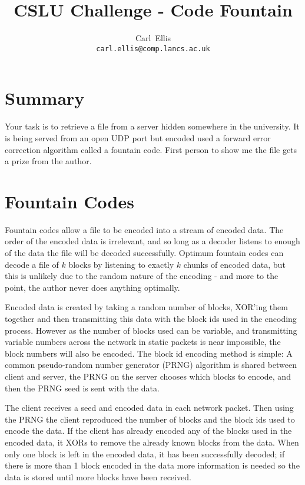 \documentclass[10pt,a4paper]{article}
\begin{document}
\title{CSLU Challenge - Code Fountain}

\author{Carl~Ellis \\ \texttt{carl.ellis@comp.lancs.ac.uk} }

\maketitle

\section{Summary}

Your task is to retrieve a file from a server hidden somewhere in the university.
It is being served from an open UDP port but encoded used a forward error correction algorithm called a fountain code.
First person to show me the file gets a prize from the author.

\section{Fountain Codes}

Fountain codes allow a file to be encoded into a stream of encoded data.
The order of the encoded data is irrelevant, and so long as a decoder listens to enough of the data the file will be decoded successfully.
Optimum fountain codes can decode a file of $k$ blocks by listening to exactly $k$ chunks of encoded data, but this is unlikely due to the random nature of the encoding - and more to the point, the author never does anything optimally.

Encoded data is created by taking a random number of blocks, XOR'ing them together and then transmitting this data with the block ids used in the encoding process.
However as the number of blocks used can be variable, and transmitting variable numbers across the network in static packets is near impossible, the block numbers will also be encoded.
The block id encoding method is simple: A common pseudo-random number generator (PRNG) algorithm is shared between client and server, the PRNG on the server chooses which blocks to encode, and then the PRNG seed is sent with the data.

The client receives a seed and encoded data in each network packet.
Then using the PRNG the client reproduced the number of blocks and the block ids used to encode the data.
If the client has already encoded any of the blocks used in the encoded data, it XORs to remove the already known blocks from the data.
When only one block is left in the encoded data, it has been successfully decoded; if there is more than 1 block encoded in the data more information is needed so the data is stored until more blocks have been received.
\end{document}
